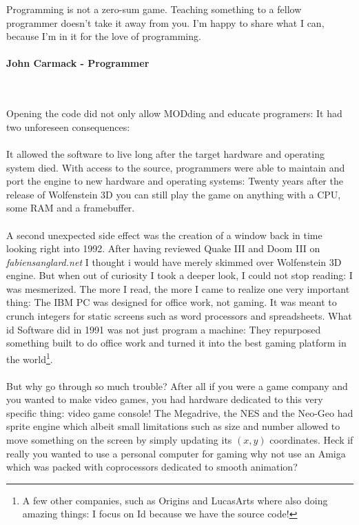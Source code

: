  \begin{fancyquotes}
   Programming is not a zero-sum game. Teaching something to a fellow programmer doesn't take it away from you. I'm happy to share what I can, because I'm in it for the love of programming.\\
   \\
\textbf{John Carmack - Programmer}
 \end{fancyquotes}\\
\\
Opening the code did not only allow MODding and educate programers: It had two unforeseen consequences:\\
\\
It allowed the software to live long after the target hardware and operating system died. With access to the source, programmers were able to maintain and port the engine to new hardware and operating systems: Twenty years after the release of Wolfenstein 3D you can still play the game on anything with a CPU, some RAM and a framebuffer. \\
\\
A second unexpected side effect was the creation of a window back in time looking right into 1992. After having reviewed Quake III and Doom III on \emph{fabiensanglard.net} I thought i would have merely skimmed over Wolfenstein 3D engine. But when out of curiosity I took a deeper look, I could not stop reading: I was mesmerized. The more I read, the more I came to realize one very important thing: The IBM PC was designed for office work, not gaming. It was meant to crunch integers for static screens such as word processors and spreadsheets. What id Software did in 1991 was not just program a machine: They repurposed something built to do office work and turned it into the best gaming platform in the world\footnote{A few other companies, such as Origins and LucasArts where also doing amazing things: I focus on Id because we have the source code!}.\\
\\
But why go through so much trouble? After all if you were a game company and you wanted to make video games, you had hardware dedicated to this very specific thing: video game console! The Megadrive, the NES and the Neo-Geo had sprite engine which albeit small limitations such as size and number allowed to move something on the screen by simply updating its $(x,y)$ coordinates. Heck if really you wanted to use a personal computer for gaming why not use an Amiga which was packed with coprocessors dedicated to smooth animation?\\
